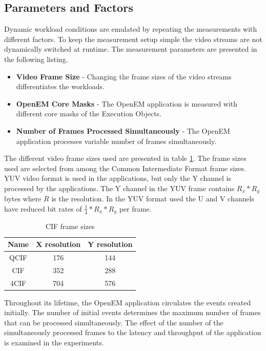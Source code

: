 \subsection{Parameters and Factors}
\label{subsec:parameters-and-factors}
Dynamic workload conditions are emulated by repeating the measurements with different factors. To keep the measurement setup simple the video streams are not dynamically switched at runtime. The measurement parameters are presented in the following listing.

\begin{itemize}
    \item \textbf{Video Frame Size} - Changing the frame sizes of the video streams differentiates the workloads.
    \item \textbf{OpenEM Core Masks} - The OpenEM application is measured with different core masks of the Execution Objects.
    \item \textbf{Number of Frames Processed Simultaneously} - The OpenEM application processes variable number of frames simultaneously.
\end{itemize}

The different video frame sizes used are presented in table \ref{tab:cif_frames}. The frame sizes used are selected from among the Common Intermediate Format frame sizes. YUV video format is used in the applications, but only the Y channel is processed by the applications. The Y channel in the YUV frame contains $R_{x} * R_{y}$ bytes where $R$ is the resolution. In the YUV format used the U and V channels have reduced bit rates of $\frac{1}{4} * R_{x} * R_{y}$ per frame.

\begin{table}
    \begin{center}
        \begin{tabular}{ c c c }
            Name  & X resolution  & Y resolution \\ \hline
            QCIF  & 176           & 144          \\ \hline
            CIF   & 352           & 288          \\ \hline
            4CIF  & 704           & 576          \\ \hline
        \end{tabular}
        \caption{CIF frame sizes}
        \label{tab:cif_frames}
    \end{center}
\end{table}

Throughout its lifetime, the OpenEM application circulates the events created initially. The number of initial events determines the maximum number of frames that can be processed simultaneously. The effect of the number of the simultaneously processed frames to the latency and throughput of the application is examined in the experiments.

